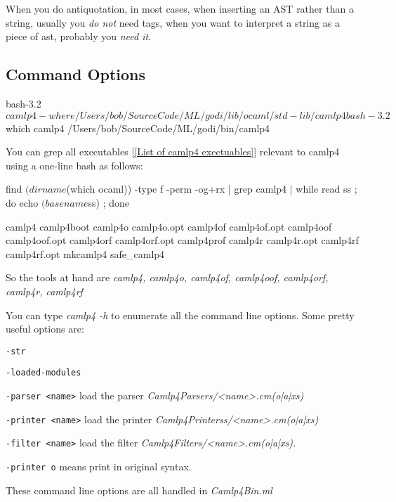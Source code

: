 When you do antiquotation, in most cases, when inserting an AST rather
than a string, usually you \textit{do not} need tags, when you want to
interpret a string as a piece of ast, probably you \textit{need it.}
  
\subsection{Command Options}

\begin{bashcode}
bash-3.2$ camlp4 -where
/Users/bob/SourceCode/ML/godi/lib/ocaml/std-lib/camlp4
bash-3.2$ which camlp4
/Users/bob/SourceCode/ML/godi/bin/camlp4
\end{bashcode}


You can grep all executables [\ref{List of camlp4 exectuables}]
relevant to camlp4 using a one-line bash as follows:

\begin{bashcode}
find $(dirname $(which ocaml)) -type f -perm -og+rx | grep camlp4 |
while read ss ; do echo $(basename $ss) ; done
\end{bashcode}

\begin{bluetext}  
camlp4 camlp4boot camlp4o camlp4o.opt camlp4of camlp4of.opt camlp4oof
camlp4oof.opt camlp4orf camlp4orf.opt camlp4prof camlp4r camlp4r.opt
camlp4rf camlp4rf.opt mkcamlp4 safe_camlp4
\end{bluetext}

So the tools at hand are \textit{camlp4, camlp4o, camlp4of, camlp4oof,
  camlp4orf, camlp4r, camlp4rf }

You can type \textit{camlp4 -h } to enumerate all the command line
options. Some pretty useful options are: 

\verb|-str|

\verb|-loaded-modules|

\verb|-parser <name>| load the parser \textit{Camlp4Parsers/<name>.cm(o|a|xs)}


\verb|-printer <name>| load the printer
\textit{Camlp4Printerss/<name>.cm(o|a|xs)}

\verb|-filter <name>| load the filter 
\textit{Camlp4Filters/<name>.cm(o|a|xs).}


\verb|-printer o| means print in original syntax. 


These command line options are all handled in \emph{Camlp4Bin.ml}

